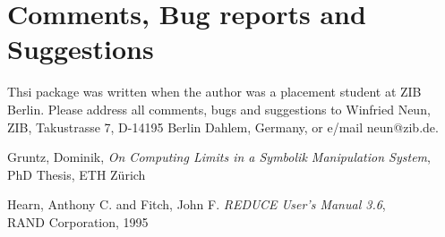 \section{Comments, Bug reports and Suggestions}
Thsi package was written when the author was a placement student at ZIB Berlin. Please address all comments, bugs and suggestions to Winfried Neun, ZIB, Takustrasse 7, D-14195 Berlin Dahlem, Germany, or e/mail neun@zib.de. \\
\pagebreak
\begin{thebibliography}{99999}
\normalsize

 Gruntz, Dominik,
{\it On Computing Limits in a Symbolik Manipulation System}, \\
PhD Thesis, ETH Z\"urich

 Hearn, Anthony C. and Fitch, John F.
{\it REDUCE User's Manual 3.6}, \\ RAND Corporation, 1995

\end{thebibliography}




